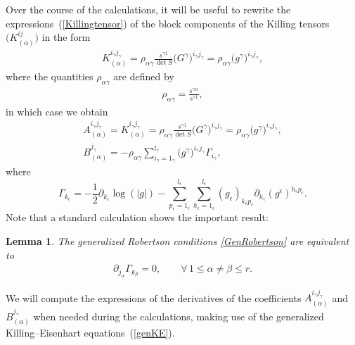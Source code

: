\documentclass[pdftex]{sigma}
\numberwithin{equation}{section}
\newtheorem{Lemma}[Theorem]{Lemma}
\newcommand{\jalpha}{j_{\alpha}}
\newcommand{\kbeta}{k_{\beta}}
\newcommand{\igamma}{i_{\gamma}}
\newcommand{\jgamma}{j_{\gamma}}
\newcommand{\lgamma}{l_{\gamma}}
\newcommand{\kepsilon}{k_{\epsilon}}
\newcommand{\pepsilon}{p_{\epsilon}}
\newcommand{\lepsilon}{l_{\epsilon}}
\newcommand{\hepsilon}{h_{\epsilon}}
\begin{document}
Over the course of the calculations, it will be useful to rewrite the expressions~(\ref{Killingtensor}) of the block components of the Killing tensors $\big(K_{(\alpha)}^{ij}\big)$ in the form
\begin{gather}\label{Killingtensormod}
K_{(\alpha)}^{\igamma \jgamma}=\rho_{\alpha \gamma}\frac{s^{\gamma 1}}{\det S}\big(G^{\gamma}\big)^{\igamma \jgamma}=\rho_{\alpha \gamma}\big(g^{\gamma}\big)^{\igamma \jgamma},
\end{gather}
where the quantities $\rho_{\alpha \gamma}$ are defined by
\begin{gather}\label{rhotwo}
\rho_{\alpha \gamma}=\frac{s^{\gamma \alpha}}{s^{\gamma 1}},
\end{gather}
in which case we obtain
\begin{gather}
A_{(\alpha)}^{\igamma \jgamma}=K_{(\alpha)}^{\igamma \jgamma}=\rho_{\alpha \gamma}\frac{s^{\gamma 1}}{\det S}\big(G^{\gamma}\big)^{\igamma \jgamma}=\rho_{\alpha \gamma}\big(g^{\gamma}\big)^{\igamma \jgamma},\nonumber\\
 B_{(\alpha)}^{\jgamma}=-\rho_{\alpha \gamma}\sum_{\igamma = 1_{\gamma}}^{\lgamma} \big(g^{\gamma}\big)^{\igamma \jgamma}\Gamma_{\igamma},\label{coeffmod}
\end{gather}
where
\[
\Gamma_{\kepsilon}=-\frac{1}{2}\partial_{\kepsilon}\log (|g|)-\sum_{\pepsilon=1_{\epsilon}}^{\lepsilon}\sum_{\hepsilon=1_{\epsilon}}^{\lepsilon}(g_{\epsilon})_{\kepsilon \pepsilon}\partial_{\hepsilon}(g^{\epsilon})^{\hepsilon \pepsilon}.
\]
Note that a standard calculation shows the important result:

\begin{Lemma} \label{RC-NewFormulation}The generalized Robertson conditions \eqref{GenRobertson} are equivalent to
\begin{gather*} %
 \partial_{\jalpha} \Gamma_{\kbeta} = 0, \qquad \forall\, 1 \leq \alpha \ne \beta \leq r.
\end{gather*}
\end{Lemma}

We will compute the expressions of the derivatives of the coefficients $A_{(\alpha)}^{\igamma \jgamma}$ and $B_{(\alpha)}^{\jgamma}$ when needed during the calculations, making use of the generalized Killing--Eisenhart equations~(\ref{genKE}).
\end{document}
